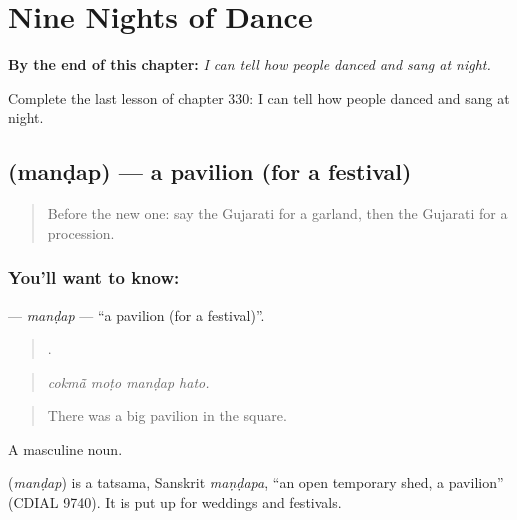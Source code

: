 
\chapter{Nine Nights of Dance}
\label{ch:gu-nine-nights-of-dance}

\begin{chapteropening}
\textbf{By the end of this chapter:} \emph{I can tell how people danced and sang at night.}

Complete the last lesson of chapter 330: I can tell how people danced and sang at night.
\end{chapteropening}

\section[\texorpdfstring{\gu{મંડપ} (manḍap)}{મંડપ (manḍap)}]{ (manḍap) — a pavilion (for a festival)}

\label{lesson:GU-C330-mandap}



\begin{quote}
Before the new one: say the Gujarati for a garland, then the Gujarati for a procession.
\end{quote}

\subsection*{You'll want to know: }
\textbf{} — \emph{manḍap} — \textquotedblleft{}a pavilion (for a festival)\textquotedblright{}.

\begin{quote}
   .
\end{quote}

\begin{quote}
\emph{cokmā̃ moṭo manḍap hato.}
\end{quote}

\begin{quote}
There was a big pavilion in the square.
\end{quote}

A masculine noun.

\begin{cousinweb}
\textbf{} (\emph{manḍap}) is a tatsama, Sanskrit \emph{maṇḍapa}, \textquotedblleft{}an open temporary shed, a pavilion\textquotedblright{} (CDIAL 9740). It is put up for weddings and festivals.
\end{cousinweb}

